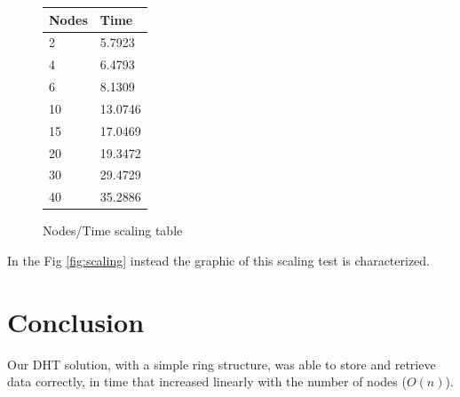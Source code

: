 \documentclass[11pt,conference]{IEEEtran}
\begin{document}
\begin{figure}[h!]
\centering
\caption{Nodes/Time scaling table}
\begin{tabular}[H]{ | l | l | }
\hline
	Nodes & Time \\ \hline
	2 & 5.7923 \\ \hline
	4 & 6.4793 \\ \hline
	6 & 8.1309 \\ \hline
	10 & 13.0746 \\ \hline
	15 & 17.0469 \\ \hline
	20 & 19.3472 \\ \hline
	30 & 29.4729 \\ \hline
	40 & 35.2886 \\ \hline
\end{tabular}
\label{tab:scaling}
\end{figure}

In the Fig \ref{fig:scaling} instead the graphic of this scaling test is characterized.




\section{Conclusion}

Our DHT solution, with a simple ring structure, was able to store and retrieve
data correctly, in time that increased linearly with the number of nodes
($O(n)$).




\end{document}
